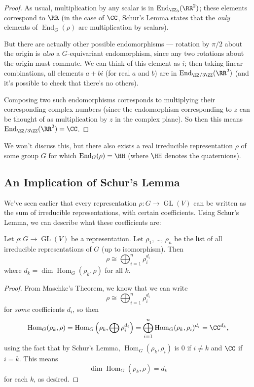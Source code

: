 \begin{proof}
As usual, multiplication by any scalar is in $\operatorname{End}_{\ZZ_3}(\RR^2)$; these elements correspond to $\RR$ (in the case of $\CC$, Schur's Lemma states that the \emph{only} elements of $\operatorname{End}_G(\rho)$ are multiplication by scalars). 

But there are actually other possible endomorphisms --- rotation by $\pi/2$ about the origin is \emph{also} a $G$-equivariant endomorphism, since any two rotations about the origin must commute. We can think of this element as $i$; then taking linear combinations, all elements $a + bi$ (for real $a$ and $b$) are in $\operatorname{End}_{\ZZ/3\ZZ}(\RR^2)$ (and it's possible to check that there's no others). 

Composing two such endomorphisms corresponds to multiplying their corresponding complex numbers (since the endomorphism corresponding to $z$ can be thought of as multiplication by $z$ in the complex plane). So then this means $\operatorname{End}_{\ZZ/3\ZZ}(\RR^2) = \CC$. 
\end{proof}

We won't discuss this, but there also exists a real irreducible representation $\rho$ of some group $G$ for which $\operatorname{End}_G(\rho) = \HH$ (where $\HH$ denotes the quaternions). 

\subsection{An Implication of Schur's Lemma}

We've seen earlier that every representation $\rho : G \to \operatorname{GL}(V)$ can be written as the sum of irreducible representations, with certain coefficients. Using Schur's Lemma, we can describe what these coefficients are:

\begin{corollary}
Let $\rho: G \to \operatorname{GL}(V)$ be a representation. Let $\rho_1$, \ldots, $\rho_n$ be the list of all irreducible representations of $G$ (up to isomorphism). Then \[\rho \cong \bigoplus_{i = 1}^n \rho_i^{d_i}\] where $d_k = \dim \operatorname{Hom}_G(\rho_k, \rho)$ for all $k$.
\end{corollary}

\begin{proof}
From Maschke's Theorem, we know that we can write \[\rho \cong \bigoplus_{i = 1}^n \rho_i^{d_i}\] for \emph{some} coefficients $d_i$, so then \[\operatorname{Hom}_G(\rho_k, \rho) = \operatorname{Hom}_G\left(\rho_k, \bigoplus \rho_i^{d_i}\right) = \bigoplus_{i = 1}^n \operatorname{Hom}_G(\rho_k, \rho_i)^{d_i} = \CC^{d_k},\] using the fact that by Schur's Lemma, $\operatorname{Hom}_G(\rho_k, \rho_i) $ is $0$ if $i \neq k$ and $\CC$ if $i = k$. This means \[\dim \operatorname{Hom}_G(\rho_k, \rho) = d_k\] for each $k$, as desired. 
\end{proof}

